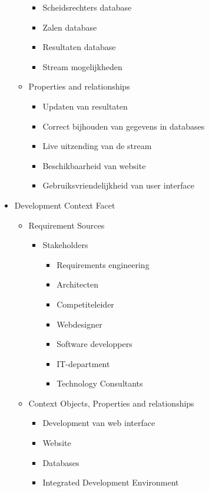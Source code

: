 \documentclass[12pt,a4paper]{article}
\begin{document}
\begin{itemize}
\begin{itemize}
\begin{itemize}
					\item Scheidsrechters database
					\item Zalen database
					\item Resultaten database
					\item Stream mogelijkheden
				\end{itemize}
				\item Properties and relationships
				\begin{itemize}
					\item Updaten van resultaten
					\item Correct bijhouden van gegevens in databases
					\item Live uitzending van de stream
					\item Beschikbaarheid van website
					\item Gebruiksvriendelijkheid van user interface
				\end{itemize}
			\end{itemize}
			\item Development Context Facet
			\begin{itemize}
				\item Requirement Sources
				\begin{itemize}
					\item Stakeholders
					\begin{itemize}
						\item Requirements engineering
						\item Architecten
						\item Competiteleider
						\item Webdesigner
						\item Software developpers
						\item IT-department
						\item Technology Consultants
					\end{itemize}
				\end{itemize}
				\item Context Objects, Properties and relationships
				\begin{itemize}
					\item Development van web interface
					\item Website
					\item Databases
					\item Integrated Development Environment
				\end{itemize}
			\end{itemize}
		\end{itemize}
		\newpage
\end{document}

